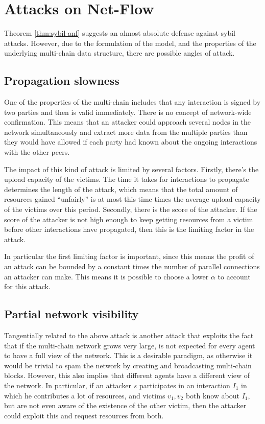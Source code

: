 \documentclass[a4paper,11pt]{book}
\theoremstyle{definition}
\begin{document}
\section{Attacks on Net-Flow}

Theorem \ref{thm:sybil-anf} suggests an almost absolute defense against sybil attacks. However,
due to the formulation of the model, and the properties of the underlying multi-chain data structure,
there are possible angles of attack.

\subsection{Propagation slowness}

One of the properties of the multi-chain includes that any interaction is signed by two parties and
then is valid immediately. There is no concept of network-wide confirmation. This means that an attacker
could approach several nodes in the network simultaneously and extract more data from the multiple parties
than they would have allowed if each party had known about the ongoing interactions with the other peers.

The impact of this kind of attack is limited by several factors. Firstly, there's the upload capacity of the
victims. The time it takes for interactions to propagate determines the length of the attack, which means that
the total amount of resources gained ``unfairly'' is at most this time times the average upload capacity of
the victims over this period. Secondly, there is the score of the attacker. If the score of the attacker is
not high enough to keep getting resources from a victim before other interactions have propagated, then this
is the limiting factor in the attack. 

In particular the first limiting factor is important, since this means the profit of an attack can be bounded
by a constant times the number of parallel connections an attacker can make. This means it is possible
to choose a lower $\alpha$ to account for this attack. 

\subsection{Partial network visibility}

Tangentially related to the above attack is another attack that exploits the fact that if the multi-chain
network grows very large, is not expected for every agent to have a full view of the network. This
is a desirable paradigm, as otherwise it would be trivial to spam the network by creating and broadcasting
multi-chain blocks. However, this also implies that different agents have a different view of the network.
In particular, if an attacker $s$ participates in an interaction $I_1$ in which he contributes a lot
of resources, and victims $v_1, v_2$ both know about $I_1$, but are not even aware of the existence of
the other victim, then the attacker could exploit this and request resources from both. 
\end{document}

